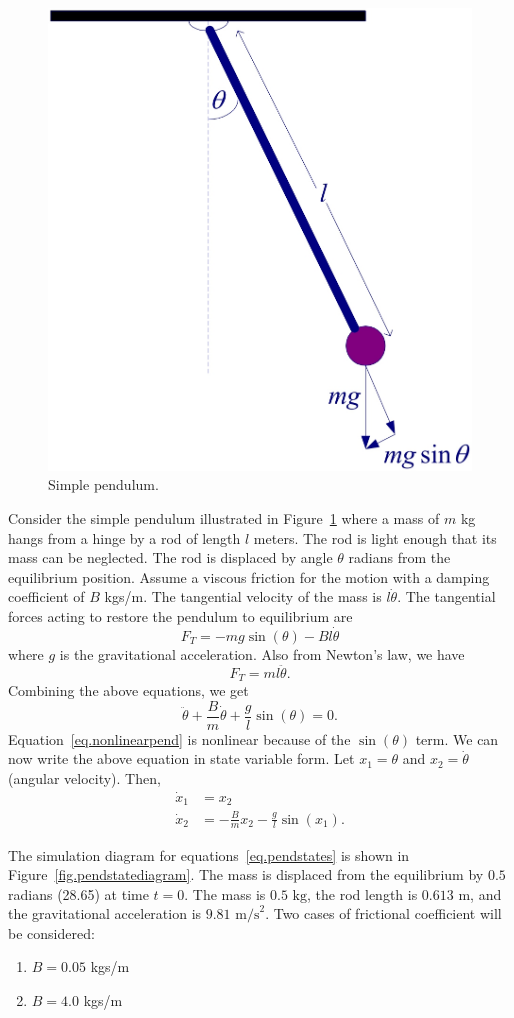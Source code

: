 \begin{figure}[thb]
\centering
\includegraphics[width=.4\textwidth]{PendModel}
\caption{\footnotesize
        Simple pendulum.
        \label{fig.penddiagram}
        }
\end{figure}

Consider the simple pendulum illustrated in Figure~\ref{fig.penddiagram} where a mass of $m$ kg hangs from a hinge by a rod of length $l$ meters.  The rod is light enough that its mass can be neglected.  The rod is displaced by angle $\theta$ radians from the equilibrium position.  Assume a viscous friction for the motion with a damping coefficient of $B$ kgs/m.  The tangential velocity of the mass is $l\dot{\theta}$.  The tangential forces acting to restore the pendulum to equilibrium are
\begin{equation}
    F_T = -mg\sin(\theta) - Bl\dot{\theta}
\end{equation}
where $g$ is the gravitational acceleration.  Also from Newton's law, we have
\begin{equation}
    F_T = ml\ddot{\theta}.
\end{equation}
Combining the above equations, we get
\begin{equation}    \label{eq.nonlinearpend}
    \ddot{\theta} + \frac{B}{m}\dot{\theta}+\frac{g}{l}\sin(\theta) = 0.
\end{equation}
Equation~\eqref{eq.nonlinearpend} is nonlinear because of the $\sin(\theta)$ term.  We can now write the above equation in state variable form.  Let $x_1 = \theta$ and $x_2 = \dot{\theta}$ (angular velocity).  Then,
\begin{subequations}    \label{eq.pendstates}
    \begin{flalign}
        \dot{x}_1 &= x_2 \\
        \dot{x}_2 &= -\frac{B}{m}x_2-\frac{g}{l}\sin(x_1).
    \end{flalign}
\end{subequations}
\par
The simulation diagram for equations~\eqref{eq.pendstates} is shown in Figure~\ref{fig.pendstatediagram}.  The mass is displaced from the equilibrium by $0.5$ radians (28.65\textdegree) at time $t=0$.  The mass is $0.5\mbox{ kg}$, the rod length is $0.613\mbox{ m}$, and the gravitational acceleration is $9.81\mbox{ m/s}^2$.  Two cases of frictional coefficient will be considered:
\begin{enumerate}
\item
    $B = 0.05$ kgs/m
\item
    $B = 4.0$ kgs/m
\end{enumerate}

